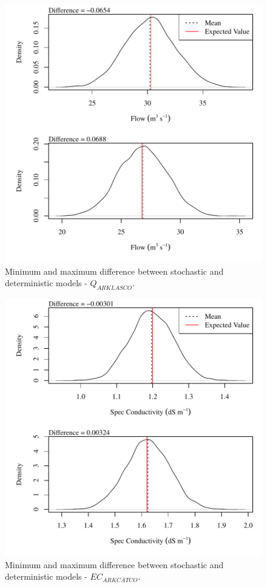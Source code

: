 \begin{center}
\begin{figure}[htbp]
	\includegraphics[width=6in]{"Figures/Results_USR/V min-max diff qout"}
	\caption{Minimum and maximum difference between stochastic and deterministic models - $Q_{ARKLASCO}$.}
\end{figure}
\end{center}
\newpage

\begin{center}
\begin{figure}[htbp]
	\includegraphics[width=6in]{"Figures/Results_USR/V min-max diff ecin"}
	\caption{Minimum and maximum difference between stochastic and deterministic models - $EC_{ARKCATCO}$.}
\end{figure}
\end{center}
\newpage

